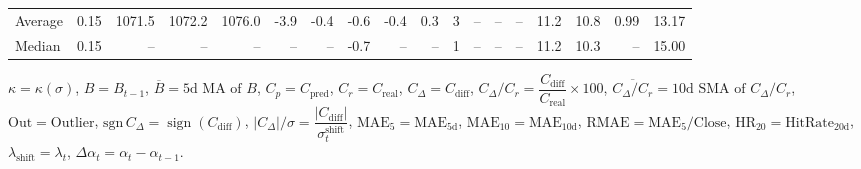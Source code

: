 \begin{threeparttable}
{\begin{tabular}{lrrrrrrrrrrrrrrrrr}
Average &     0.15 & 1071.5 & 1072.2 & 1076.0 &       -3.9 &           -0.4 &                      -0.6 &                     -0.4 &                 0.3 &              3 &         -- &        -- &             -- &             11.2 &                10.8 &            0.99 &                  13.17 \\
 Median &     0.15 &     -- &     -- &     -- &         -- &             -- &                      -0.7 &                       -- &                  -- &              1 &         -- &        -- &             -- &             11.2 &                10.3 &              -- &                  15.00 \\
\bottomrule
\end{tabular}
}
\begin{tablenotes}\footnotesize
\item $\kappa=\kappa(\sigma)$, $B=B_{t-1}$, $\overline{B}=\text{5d MA of }B$, $C_p=C_{\text{pred}}$, $C_r=C_{\text{real}}$, $C_\Delta=C_{\text{diff}}$, $C_\Delta/C_r=\dfrac{C_{\text{diff}}}{C_{\text{real}}}\times100$, $\overline{C_\Delta/C_r}=\text{10d SMA of }C_\Delta/C_r$, $\mathrm{Out}=\text{Outlier}$, $\mathrm{sgn}\,C_\Delta=\operatorname{sign}(C_{\text{diff}})$, $|C_\Delta|/\sigma=\dfrac{|C_{\text{diff}}|}{\sigma_t^{\text{shift}}}$, $\mathrm{MAE}_5=\mathrm{MAE}_{5\text{d}}$, $\mathrm{MAE}_{10}=\mathrm{MAE}_{10\text{d}}$, $\mathrm{RMAE}= \mathrm{MAE}_5 / \text{Close}$, $\mathrm{HR}_{20}=\mathrm{HitRate}_{20\text{d}}$, $\lambda_{\text{shift}}=\lambda_t$, $\Delta\alpha_t=\alpha_t-\alpha_{t-1}$.
\end{tablenotes}
\end{threeparttable}
\endgroup

